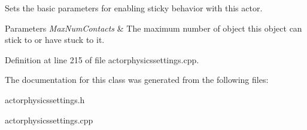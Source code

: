 Sets the basic parameters for enabling sticky behavior with this actor. 


\begin{DoxyParams}{Parameters}
{\em MaxNumContacts} & The maximum number of object this object can stick to or have stuck to it. \\
\hline
\end{DoxyParams}


Definition at line 215 of file actorphysicssettings.cpp.



The documentation for this class was generated from the following files:\begin{DoxyCompactItemize}
\item 
actorphysicssettings.h\item 
actorphysicssettings.cpp\end{DoxyCompactItemize}

